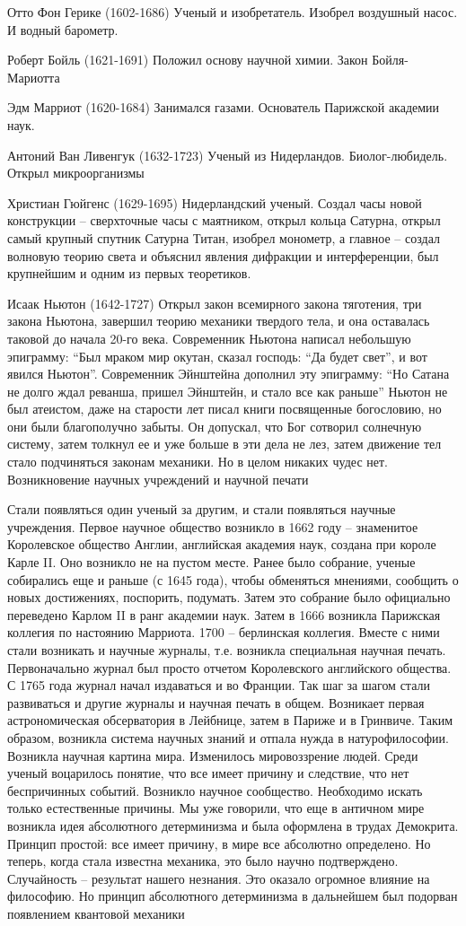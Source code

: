 Отто Фон Герике (1602-1686) Ученый и изобретатель. Изобрел воздушный насос. И водный барометр.

Роберт Бойль (1621-1691) Положил основу научной химии. Закон Бойля-Мариотта

Эдм Марриот (1620-1684) Занимался газами. Основатель Парижской академии наук.

Антоний Ван Ливенгук (1632-1723) Ученый из Нидерландов. Биолог-любидель. Открыл микроорганизмы

Христиан Гюйгенс (1629-1695) Нидерландский ученый. Создал часы новой конструкции – сверхточные часы с маятником, открыл кольца Сатурна, открыл самый крупный спутник Сатурна Титан, изобрел монометр, а главное – создал волновую теорию света и объяснил явления дифракции и интерференции, был крупнейшим и одним из первых теоретиков.

Исаак Ньютон (1642-1727) Открыл закон всемирного закона тяготения, три закона Ньютона, завершил теорию механики твердого тела, и она оставалась таковой до начала 20-го века. Современник Ньютона написал небольшую эпиграмму: “Был мраком мир окутан, сказал господь: “Да будет свет”, и вот явился Ньютон”. Современник Эйнштейна дополнил эту эпиграмму: “Но Сатана не долго ждал реванша, пришел Эйнштейн, и стало все как раньше” Ньютон не был атеистом, даже на старости лет писал книги посвященные богословию, но они были благополучно забыты. Он допускал, что Бог сотворил солнечную систему, затем толкнул ее и уже больше в эти дела не лез, затем движение тел стало подчиняться законам механики. Но в целом никаких чудес нет.
Возникновение научных учреждений и научной печати

Стали появляться один ученый за другим, и стали появляться научные учреждения. Первое научное общество возникло в 1662 году – знаменитое Королевское общество Англии, английская академия наук, создана при короле Карле II. Оно возникло не на пустом месте. Ранее было собрание, ученые собирались еще и раньше (с 1645 года), чтобы обменяться мнениями, сообщить о новых достижениях, поспорить, подумать. Затем это собрание было официально переведено Карлом II в ранг академии наук. Затем в 1666 возникла Парижская коллегия по настоянию Марриота. 1700 – берлинская коллегия. Вместе с ними стали возникать и научные журналы, т.е. возникла специальная научная печать. Первоначально журнал был просто отчетом Королевского английского общества. С 1765 года журнал начал издаваться и во Франции. Так шаг за шагом стали развиваться и другие журналы и научная печать в общем. Возникает первая астрономическая обсерватория в Лейбнице, затем в Париже и в Гринвиче. Таким образом, возникла система научных знаний и отпала нужда в натурофилософии. Возникла научная картина мира. Изменилось мировоззрение людей. Среди ученый воцарилось понятие, что все имеет причину и следствие, что нет беспричинных событий. Возникло научное сообщество. Необходимо искать только естественные причины. Мы уже говорили, что еще в античном мире возникла идея абсолютного детерминизма и была оформлена в трудах Демокрита. Принцип простой: все имеет причину, в мире все абсолютно определено. Но теперь, когда стала известна механика, это было научно подтверждено. Случайность – результат нашего незнания. Это оказало огромное влияние на философию. Но принцип абсолютного детерминизма в дальнейшем был подорван появлением квантовой механики
